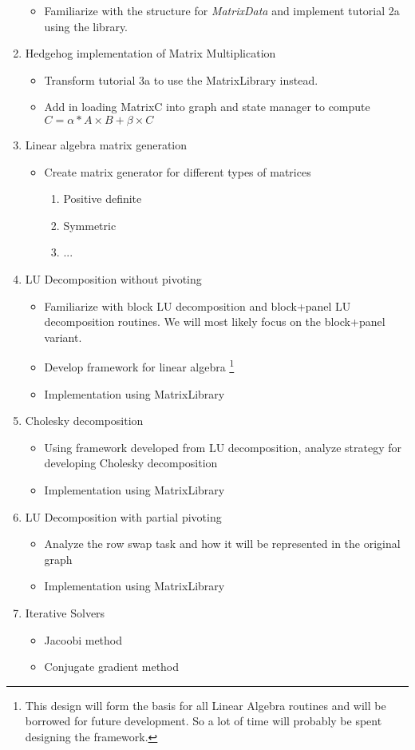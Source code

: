 \documentclass[]{article}
\begin{document}
\begin{enumerate}
\begin{itemize}
\begin{itemize}
  		\end{itemize}
  		\item Familiarize with the structure for \emph{MatrixData} and implement tutorial 2a using the library.
  	\end{itemize}
  \item Hedgehog implementation of Matrix Multiplication
  	\begin{itemize}
  		\item Transform tutorial 3a to use the MatrixLibrary instead.
  		\item Add in loading MatrixC into graph and state manager to compute $C = \alpha*A \times B + \beta \times C$
  	\end{itemize}
  \item Linear algebra matrix generation
  	\begin{itemize}
  		\item Create matrix generator for different types of matrices
  		\begin{enumerate}
  			\item Positive definite
  			\item Symmetric
  			\item ...
  		\end{enumerate}
  	\end{itemize}
  \item LU Decomposition without pivoting
  	\begin{itemize}
  		\item Familiarize with block LU decomposition and block+panel LU decomposition routines. We will most likely focus on the block+panel variant.
  		\item Develop framework for linear algebra \footnote{This design will form the basis for all Linear Algebra routines and will be borrowed for future development. So a lot of time will probably be spent designing the framework.}
  		\item Implementation using MatrixLibrary 
  	\end{itemize}
  \item Cholesky decomposition
  	\begin{itemize}
  		\item Using framework developed from LU decomposition, analyze strategy for developing Cholesky decomposition
  		\item Implementation using MatrixLibrary
  	\end{itemize}
  \item LU Decomposition with partial pivoting
  	\begin{itemize}
  		\item Analyze the row swap task and how it will be represented in the original graph
  		\item Implementation using MatrixLibrary
  	\end{itemize}
  \item Iterative Solvers
  	\begin{itemize}
  		\item Jacoobi method
  		\item Conjugate gradient method
  	\end{itemize}
  

\end{enumerate}
\end{document}
